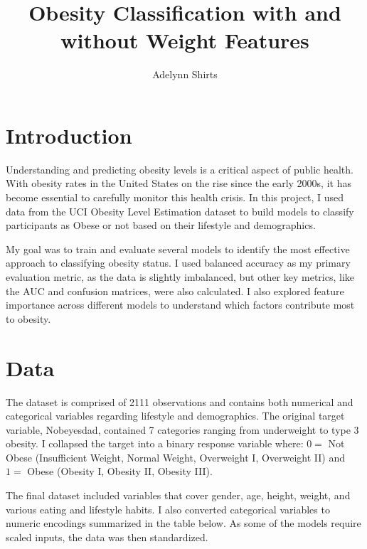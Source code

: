 \documentclass[a4paper,12pt]{article}
\author{Adelynn Shirts}
\title{Obesity Classification with and without Weight Features}
\date{}
\begin{document}
\maketitle
\section{Introduction}

Understanding and predicting obesity levels is a critical aspect of public health. With obesity rates in the United States on the rise since the early 2000s, it has become essential to carefully monitor this health crisis. In this project, I used data from the UCI Obesity Level Estimation dataset to build models to classify participants as Obese or not based on their lifestyle and demographics.

My goal was to train and evaluate several models to identify the most effective approach to classifying obesity status. I used balanced accuracy as my primary evaluation metric, as the data is slightly imbalanced, but other key metrics, like the AUC and confusion matrices, were also calculated. I also explored feature importance across different models to understand which factors contribute most to obesity.
\section{Data}
The dataset is comprised of 2111 observations and contains both numerical and categorical variables regarding lifestyle and demographics. The original target variable, Nobeyesdad, contained 7 categories ranging from underweight to type 3 obesity. I collapsed the target into a binary response variable where: 
$0 =$ Not Obese (Insufficient Weight, Normal Weight, Overweight I, Overweight II) and
$1 =$ Obese (Obesity I, Obesity II, Obesity III).

The final dataset included variables that cover gender, age, height, weight, and various eating and lifestyle habits. I also converted categorical variables to numeric encodings summarized in the table below. As some of the models require scaled inputs, the data was then standardized. 
\end{document}
